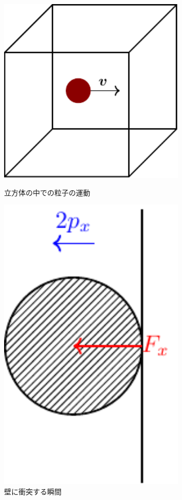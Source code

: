 \documentclass[unicode,a4paper,10pt]{ltjsarticle}
\begin{document}
\begin{enumerate}
  \begin{figure}[ht]
    \centering
    \begin{minipage}{0.4\textwidth}
      \centering
      \includegraphics[width=0.8\textwidth]{fig/fig01.pdf}
      \caption{立方体の中での粒子の運動}      
    \end{minipage}
    \begin{minipage}{0.4\textwidth}
      \centering
      \includegraphics[width=0.8\textwidth]{fig/fig02.pdf}
      \caption{壁に衝突する瞬間}      
    \end{minipage}
  \end{figure}


\end{enumerate}
\end{document}
